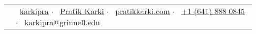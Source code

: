 \documentclass[10pt,a4paper]{article}
\newcommand{\metasection}[2]
{ 
\begin{tabular*}{1\textwidth}{p{0cm} p{18cm}}
	\normalsize{\textcolor{sectcol}{#1}}&#2\\[-8pt]
\end{tabular*}
}
\begin{document}
\pagestyle{fancy}	


\vspace{-20.55cm}



\hspace{-0.25\linewidth}\colorbox{bgcol}{}



\vspace{6pt}

\metasection{}{\large{\faGithub \  \href{https://github.com/karkipra} {karkipra}  $\cdot$ 
	      \faLinkedin \ \href{https://www.linkedin.com/in/pratik-karki}{Pratik Karki} $\cdot$ 
	       \faGlobe \ \href{http://pratikkarki.com/}{pratikkarki.com}  $\cdot$ 
	       \faPhone \ \href{tel:6418880845}{+1 (641) 888 0845} $\cdot$ 
	       \faEnvelope \ \href{mailto:karkipra@grinnell.edu}{karkipra@grinnell.edu}} }


\end{document}
